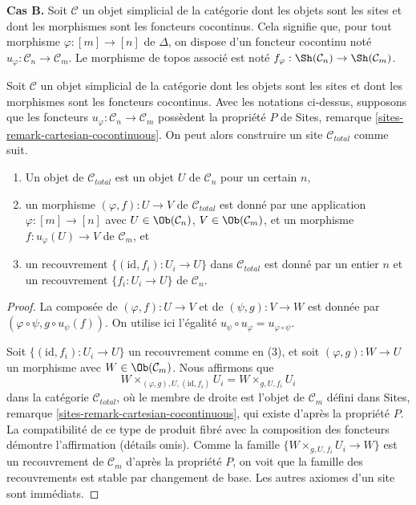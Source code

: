 \noindent
{\bf Cas B.}
Soit $\mathcal{C}$ un objet simplicial de la catégorie dont les objets sont les
sites et dont les morphismes sont les foncteurs cocontinus. Cela signifie que, pour
tout morphisme $\varphi : [m] \to [n]$ de $\Delta$, on dispose d'un foncteur cocontinu
noté $u_\varphi : \mathcal{C}_n \to \mathcal{C}_m$. Le morphisme de topos
associé est noté
$f_\varphi : \Sh(\mathcal{C}_n) \to \Sh(\mathcal{C}_m)$.

\begin{lemma}
\label{lemma-simplicial-cocontinuous-site}
Soit $\mathcal{C}$ un objet simplicial de la catégorie dont les objets sont les
sites et dont les morphismes sont les foncteurs cocontinus. Avec les notations ci-dessus,
supposons que les foncteurs $u_\varphi : \mathcal{C}_n \to \mathcal{C}_m$
possèdent la propriété $P$ de Sites, remarque \ref{sites-remark-cartesian-cocontinuous}.
On peut alors construire un site $\mathcal{C}_{total}$ comme suit.
\begin{enumerate}
\item Un objet de $\mathcal{C}_{total}$ est un objet $U$ de
$\mathcal{C}_n$ pour un certain $n$,
\item un morphisme $(\varphi, f) : U \to V$ de $\mathcal{C}_{total}$
est donné par une application $\varphi : [m] \to [n]$ avec
$U \in \Ob(\mathcal{C}_n)$, $V \in \Ob(\mathcal{C}_m)$,
et un morphisme $f : u_\varphi(U) \to V$ de $\mathcal{C}_m$, et
\item un recouvrement $\{(\text{id}, f_i) :  U_i \to U\}$ dans $\mathcal{C}_{total}$
est donné par un entier $n$ et un recouvrement $\{f_i : U_i \to U\}$
de $\mathcal{C}_n$.
\end{enumerate}
\end{lemma}

\begin{proof}
La composée de $(\varphi, f) : U \to V$ et de $(\psi, g) : V \to W$
est donnée par $(\varphi \circ \psi, g \circ u_\psi(f))$.
On utilise ici l'égalité $u_\psi \circ u_\varphi = u_{\varphi \circ \psi}$.

\medskip\noindent
Soit $\{(\text{id}, f_i) :  U_i \to U\}$ un recouvrement comme en (3),
et soit $(\varphi, g) : W \to U$ un morphisme avec
$W \in \Ob(\mathcal{C}_m)$. Nous affirmons que
$$
W \times_{(\varphi, g), U, (\text{id}, f_i)} U_i =
W \times_{g, U, f_i} U_i
$$
dans la catégorie $\mathcal{C}_{total}$, où le membre de droite
est l'objet de $\mathcal{C}_m$ défini dans
Sites, remarque \ref{sites-remark-cartesian-cocontinuous},
qui existe d'après la propriété $P$. La compatibilité de ce type de produit fibré
avec la composition des foncteurs démontre l'affirmation (détails omis).
Comme la famille $\{W \times_{g, U, f_i} U_i \to W\}$ est un
recouvrement de $\mathcal{C}_m$ d'après la propriété $P$, on voit que
la famille des recouvrements est stable par changement
de base. Les autres axiomes d'un site sont immédiats.
\end{proof}

